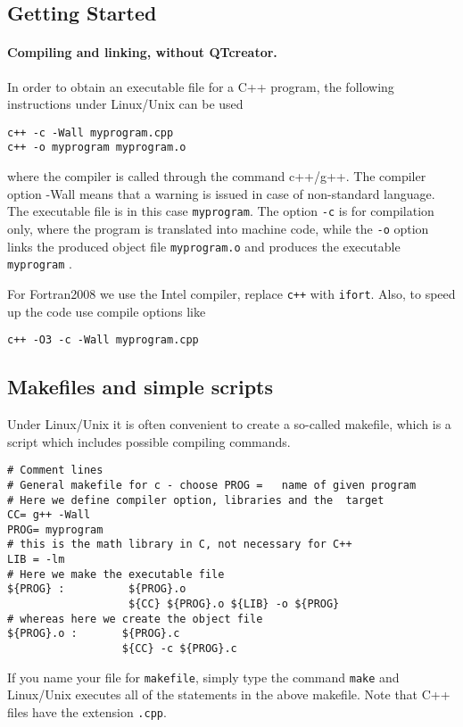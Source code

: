 \documentclass[%
oneside,                 %
final,                   %
10pt]{article}
\begin{document}
\noindent



\subsection*{Getting Started}


\paragraph{Compiling and linking, without QTcreator.}
In order to obtain an executable file for a C++ program, the following
instructions under Linux/Unix can be used

\begin{verbatim}
c++ -c -Wall myprogram.cpp
c++ -o myprogram myprogram.o
\end{verbatim}
where the compiler is called through the command c++/g++. The compiler
option -Wall means that a warning is issued in case of non-standard
language. The executable file is in this case \Verb!myprogram!. The option
\Verb!-c! is for compilation only, where the program is translated into machine code,
while the \Verb!-o! option links the produced object file \Verb!myprogram.o!
and produces the executable \Verb!myprogram! .

For Fortran2008 we use the Intel compiler, replace \Verb!c++! with \Verb!ifort!.
Also, to speed up the code use compile options like

\begin{verbatim}
c++ -O3 -c -Wall myprogram.cpp
\end{verbatim}



\subsection*{Makefiles and simple scripts}

Under Linux/Unix it is often convenient to create a
so-called makefile, which is a script which includes possible
compiling commands.

\begin{verbatim}
# Comment lines
# General makefile for c - choose PROG =   name of given program
# Here we define compiler option, libraries and the  target
CC= g++ -Wall
PROG= myprogram
# this is the math library in C, not necessary for C++
LIB = -lm
# Here we make the executable file
${PROG} :          ${PROG}.o
                   ${CC} ${PROG}.o ${LIB} -o ${PROG}
# whereas here we create the object file
${PROG}.o :       ${PROG}.c
                  ${CC} -c ${PROG}.c
\end{verbatim}
If you name your file for \Verb!makefile!, simply type the command
\Verb!make! and Linux/Unix executes all of the statements in the above
makefile. Note that C++ files have the extension \Verb!.cpp!.
\end{document}
